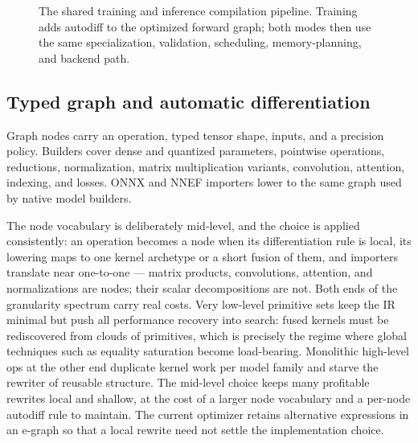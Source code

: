 \documentclass[10pt,twocolumn]{article}
\begin{document}
\begin{figure}[t]
{%
}
\caption{The shared training and inference compilation pipeline. Training adds
autodiff to the optimized forward graph; both modes then use the same
specialization, validation, scheduling, memory-planning, and backend path.}
\label{fig:pipeline}
\end{figure}

\subsection{Typed graph and automatic differentiation}

Graph nodes carry an operation, typed tensor shape, inputs, and a precision
policy. Builders cover dense and quantized parameters, pointwise operations,
reductions, normalization, matrix multiplication variants, convolution,
attention, indexing, and losses. ONNX and NNEF importers lower to the same
graph used by native model builders.

The node vocabulary is deliberately mid-level, and the choice is applied
consistently: an operation becomes a node when its differentiation rule is
local, its lowering maps to one kernel archetype or a short fusion of them,
and importers translate near one-to-one --- matrix products, convolutions,
attention, and normalizations are nodes; their scalar decompositions are
not. Both ends of the granularity spectrum carry real costs. Very low-level
primitive sets keep the IR minimal but push all performance recovery into
search: fused kernels must be rediscovered from clouds of primitives, which
is precisely the regime where global techniques such as equality saturation
become load-bearing. Monolithic high-level ops at the other end duplicate
kernel work per model family and starve the rewriter of reusable structure.
The mid-level choice keeps many profitable rewrites local and shallow,
at the cost of a larger node vocabulary and a per-node autodiff rule to
maintain. The current optimizer retains alternative expressions in an
e-graph so that a local rewrite need not settle the implementation choice.
\end{document}
